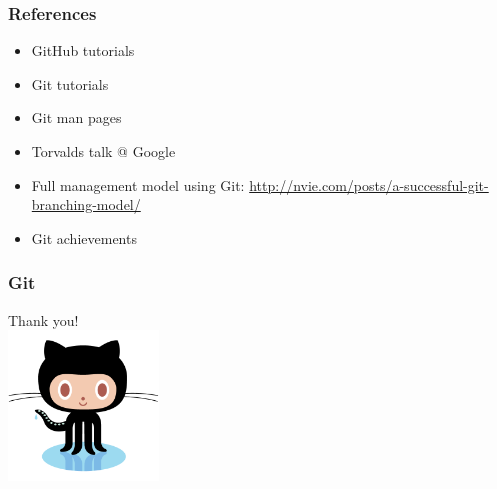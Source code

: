 \documentclass[]{beamer}
\begin{document}
\begin{frame}
  \frametitle{References}
  \begin{itemize}
    \item GitHub tutorials
    \item Git tutorials
    \item Git man pages
    \item Torvalds talk @ Google
    \item Full management model using Git:
      \url{http://nvie.com/posts/a-successful-git-branching-model/}
    \item Git achievements
  \end{itemize}
\end{frame}

\begin{frame}
  \frametitle{Git}
    \begin{center}
      Thank you! \\
      \includegraphics[height=4cm]{Octocat.png}
    \end{center}
\end{frame}
\end{document}
